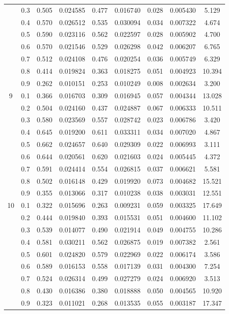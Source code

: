 \begin{longtable}{ | c | c || c | c | c | c | c | c | c | }
 & 0.3 & 0.505 & 0.024585 & 0.477 & 0.016740 & 0.028 & 0.005430 & 5.129 \\
 & 0.4 & 0.570 & 0.026512 & 0.535 & 0.030094 & 0.034 & 0.007322 & 4.674 \\
 & 0.5 & 0.590 & 0.023116 & 0.562 & 0.022597 & 0.028 & 0.005902 & 4.700 \\
 & 0.6 & 0.570 & 0.021546 & 0.529 & 0.026298 & 0.042 & 0.006207 & 6.765 \\
 & 0.7 & 0.512 & 0.024108 & 0.476 & 0.020254 & 0.036 & 0.005749 & 6.329 \\
 & 0.8 & 0.414 & 0.019824 & 0.363 & 0.018275 & 0.051 & 0.004923 & 10.394 \\
 & 0.9 & 0.262 & 0.010151 & 0.253 & 0.010249 & 0.008 & 0.002634 & 3.200 \\
 \hline
\multirow{9}{*}{9} & 0.1 & 0.366 & 0.016703 & 0.309 & 0.016945 & 0.057 & 0.004344 & 13.028 \\
 & 0.2 & 0.504 & 0.024160 & 0.437 & 0.024887 & 0.067 & 0.006333 & 10.511 \\
 & 0.3 & 0.580 & 0.023569 & 0.557 & 0.028742 & 0.023 & 0.006786 & 3.420 \\
 & 0.4 & 0.645 & 0.019200 & 0.611 & 0.033311 & 0.034 & 0.007020 & 4.867 \\
 & 0.5 & 0.662 & 0.024657 & 0.640 & 0.029309 & 0.022 & 0.006993 & 3.111 \\
 & 0.6 & 0.644 & 0.020561 & 0.620 & 0.021603 & 0.024 & 0.005445 & 4.372 \\
 & 0.7 & 0.591 & 0.024414 & 0.554 & 0.026815 & 0.037 & 0.006621 & 5.581 \\
 & 0.8 & 0.502 & 0.016148 & 0.429 & 0.019920 & 0.073 & 0.004682 & 15.521 \\
 & 0.9 & 0.355 & 0.013066 & 0.317 & 0.010238 & 0.038 & 0.003031 & 12.551 \\
 \hline
\multirow{9}{*}{10} & 0.1 & 0.322 & 0.015696 & 0.263 & 0.009231 & 0.059 & 0.003325 & 17.649 \\
 & 0.2 & 0.444 & 0.019840 & 0.393 & 0.015531 & 0.051 & 0.004600 & 11.102 \\
 & 0.3 & 0.539 & 0.014077 & 0.490 & 0.021914 & 0.049 & 0.004755 & 10.286 \\
 & 0.4 & 0.581 & 0.030211 & 0.562 & 0.026875 & 0.019 & 0.007382 & 2.561 \\
 & 0.5 & 0.601 & 0.024820 & 0.579 & 0.022969 & 0.022 & 0.006174 & 3.586 \\
 & 0.6 & 0.589 & 0.016153 & 0.558 & 0.017139 & 0.031 & 0.004300 & 7.254 \\
 & 0.7 & 0.524 & 0.026314 & 0.499 & 0.027279 & 0.024 & 0.006920 & 3.513 \\
 & 0.8 & 0.430 & 0.016386 & 0.380 & 0.018888 & 0.050 & 0.004565 & 10.920 \\
 & 0.9 & 0.323 & 0.011021 & 0.268 & 0.013535 & 0.055 & 0.003187 & 17.347 \\
 \hline
\hline
\end{longtable}
 
